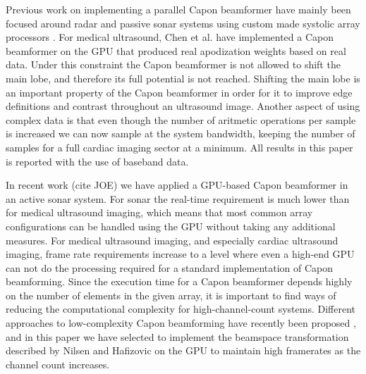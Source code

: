 \documentclass[journal]{IEEEtran}
\begin{document}
Previous work on implementing a parallel Capon beamformer have mainly been focused around radar and passive sonar systems using custom made systolic array processors \cite{McWhirter1989, Moonen1993, Sinha2002}.
For medical ultrasound, Chen et al. \cite{Chen2011a, Chen2011} have implemented a Capon beamformer on the GPU that produced real apodization weights based on real data. Under this constraint the Capon beamformer is not allowed to shift the main lobe, and therefore its full potential is not reached. Shifting the main lobe is an important property of the Capon beamformer in order for it to improve edge definitions and contrast throughout an ultrasound image. Another aspect of using complex data is that even though the number of aritmetic operations per sample is increased we can now sample at the system bandwidth, keeping the number of samples for a full cardiac imaging sector at a minimum. All results in this paper is reported with the use of baseband data.


In recent work (cite JOE) we have applied a GPU-based Capon beamformer in an active sonar system. For sonar the real-time requirement is much lower than for medical ultrasound imaging, which means that most common array configurations can be handled using the GPU without taking any additional measures. For medical ultrasound imaging, and especially cardiac ultrasound imaging, frame rate requirements increase to a level where even a high-end GPU can not do the processing required for a standard implementation of Capon beamforming. Since the execution time for a Capon beamformer depends highly on the number of elements in the given array, it is important to find ways of reducing the computational complexity for high-channel-count systems. Different approaches to low-complexity Capon beamforming have recently been proposed \cite{Asl2012, Jensen2012}, and in this paper we have selected to implement the beamspace transformation described by Nilsen and Hafizovic \cite{Nilsen2009} on the GPU to maintain high framerates as the channel count increases.  
\end{document}
